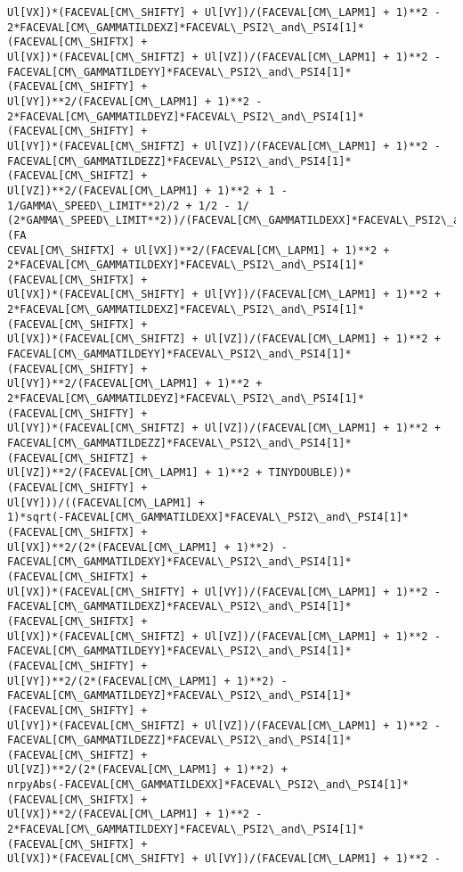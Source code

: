 \documentclass[landscape,letterpaper,10pt,english]{article}
\begin{document}
\begin{Verbatim}[commandchars=\\\{\}]
Ul[VX])*(FACEVAL[CM\_SHIFTY] + Ul[VY])/(FACEVAL[CM\_LAPM1] + 1)**2 -
2*FACEVAL[CM\_GAMMATILDEXZ]*FACEVAL\_PSI2\_and\_PSI4[1]*(FACEVAL[CM\_SHIFTX] +
Ul[VX])*(FACEVAL[CM\_SHIFTZ] + Ul[VZ])/(FACEVAL[CM\_LAPM1] + 1)**2 -
FACEVAL[CM\_GAMMATILDEYY]*FACEVAL\_PSI2\_and\_PSI4[1]*(FACEVAL[CM\_SHIFTY] +
Ul[VY])**2/(FACEVAL[CM\_LAPM1] + 1)**2 -
2*FACEVAL[CM\_GAMMATILDEYZ]*FACEVAL\_PSI2\_and\_PSI4[1]*(FACEVAL[CM\_SHIFTY] +
Ul[VY])*(FACEVAL[CM\_SHIFTZ] + Ul[VZ])/(FACEVAL[CM\_LAPM1] + 1)**2 -
FACEVAL[CM\_GAMMATILDEZZ]*FACEVAL\_PSI2\_and\_PSI4[1]*(FACEVAL[CM\_SHIFTZ] +
Ul[VZ])**2/(FACEVAL[CM\_LAPM1] + 1)**2 + 1 - 1/GAMMA\_SPEED\_LIMIT**2)/2 + 1/2 - 1/
(2*GAMMA\_SPEED\_LIMIT**2))/(FACEVAL[CM\_GAMMATILDEXX]*FACEVAL\_PSI2\_and\_PSI4[1]*(FA
CEVAL[CM\_SHIFTX] + Ul[VX])**2/(FACEVAL[CM\_LAPM1] + 1)**2 +
2*FACEVAL[CM\_GAMMATILDEXY]*FACEVAL\_PSI2\_and\_PSI4[1]*(FACEVAL[CM\_SHIFTX] +
Ul[VX])*(FACEVAL[CM\_SHIFTY] + Ul[VY])/(FACEVAL[CM\_LAPM1] + 1)**2 +
2*FACEVAL[CM\_GAMMATILDEXZ]*FACEVAL\_PSI2\_and\_PSI4[1]*(FACEVAL[CM\_SHIFTX] +
Ul[VX])*(FACEVAL[CM\_SHIFTZ] + Ul[VZ])/(FACEVAL[CM\_LAPM1] + 1)**2 +
FACEVAL[CM\_GAMMATILDEYY]*FACEVAL\_PSI2\_and\_PSI4[1]*(FACEVAL[CM\_SHIFTY] +
Ul[VY])**2/(FACEVAL[CM\_LAPM1] + 1)**2 +
2*FACEVAL[CM\_GAMMATILDEYZ]*FACEVAL\_PSI2\_and\_PSI4[1]*(FACEVAL[CM\_SHIFTY] +
Ul[VY])*(FACEVAL[CM\_SHIFTZ] + Ul[VZ])/(FACEVAL[CM\_LAPM1] + 1)**2 +
FACEVAL[CM\_GAMMATILDEZZ]*FACEVAL\_PSI2\_and\_PSI4[1]*(FACEVAL[CM\_SHIFTZ] +
Ul[VZ])**2/(FACEVAL[CM\_LAPM1] + 1)**2 + TINYDOUBLE))*(FACEVAL[CM\_SHIFTY] +
Ul[VY]))/((FACEVAL[CM\_LAPM1] +
1)*sqrt(-FACEVAL[CM\_GAMMATILDEXX]*FACEVAL\_PSI2\_and\_PSI4[1]*(FACEVAL[CM\_SHIFTX] +
Ul[VX])**2/(2*(FACEVAL[CM\_LAPM1] + 1)**2) -
FACEVAL[CM\_GAMMATILDEXY]*FACEVAL\_PSI2\_and\_PSI4[1]*(FACEVAL[CM\_SHIFTX] +
Ul[VX])*(FACEVAL[CM\_SHIFTY] + Ul[VY])/(FACEVAL[CM\_LAPM1] + 1)**2 -
FACEVAL[CM\_GAMMATILDEXZ]*FACEVAL\_PSI2\_and\_PSI4[1]*(FACEVAL[CM\_SHIFTX] +
Ul[VX])*(FACEVAL[CM\_SHIFTZ] + Ul[VZ])/(FACEVAL[CM\_LAPM1] + 1)**2 -
FACEVAL[CM\_GAMMATILDEYY]*FACEVAL\_PSI2\_and\_PSI4[1]*(FACEVAL[CM\_SHIFTY] +
Ul[VY])**2/(2*(FACEVAL[CM\_LAPM1] + 1)**2) -
FACEVAL[CM\_GAMMATILDEYZ]*FACEVAL\_PSI2\_and\_PSI4[1]*(FACEVAL[CM\_SHIFTY] +
Ul[VY])*(FACEVAL[CM\_SHIFTZ] + Ul[VZ])/(FACEVAL[CM\_LAPM1] + 1)**2 -
FACEVAL[CM\_GAMMATILDEZZ]*FACEVAL\_PSI2\_and\_PSI4[1]*(FACEVAL[CM\_SHIFTZ] +
Ul[VZ])**2/(2*(FACEVAL[CM\_LAPM1] + 1)**2) +
nrpyAbs(-FACEVAL[CM\_GAMMATILDEXX]*FACEVAL\_PSI2\_and\_PSI4[1]*(FACEVAL[CM\_SHIFTX] +
Ul[VX])**2/(FACEVAL[CM\_LAPM1] + 1)**2 -
2*FACEVAL[CM\_GAMMATILDEXY]*FACEVAL\_PSI2\_and\_PSI4[1]*(FACEVAL[CM\_SHIFTX] +
Ul[VX])*(FACEVAL[CM\_SHIFTY] + Ul[VY])/(FACEVAL[CM\_LAPM1] + 1)**2 -

\end{Verbatim}
\end{document}
